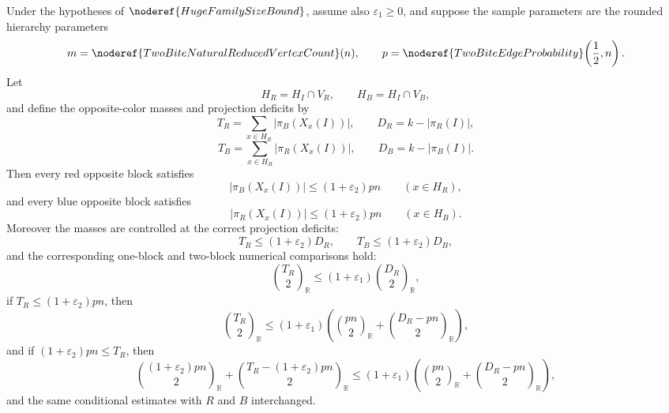 \begin{lemma}
Under the hypotheses of \(\noderef{HugeFamilySizeBound}\), assume also
\(\varepsilon_1\ge0\), and suppose the sample parameters are the rounded
hierarchy parameters
\[
m=\noderef{TwoBiteNaturalReducedVertexCount}(n),
\qquad
p=\noderef{TwoBiteEdgeProbability}\!\left(\frac12,n\right).
\]
Let
\[
H_R=H_I\cap V_R,\qquad H_B=H_I\cap V_B,
\]
and define the opposite-color masses and projection deficits by
\[
T_R=\sum_{x\in H_R}|\pi_B(X_x(I))|,\qquad
D_R=k-|\pi_R(I)|,
\]
\[
T_B=\sum_{x\in H_B}|\pi_R(X_x(I))|,\qquad
D_B=k-|\pi_B(I)|.
\]
Then every red opposite block satisfies
\[
|\pi_B(X_x(I))|\le(1+\varepsilon_2)pn\qquad (x\in H_R),
\]
and every blue opposite block satisfies
\[
|\pi_R(X_x(I))|\le(1+\varepsilon_2)pn\qquad (x\in H_B).
\]
Moreover the masses are controlled at the correct projection deficits:
\[
T_R\le(1+\varepsilon_2)D_R,\qquad
T_B\le(1+\varepsilon_2)D_B,
\]
and the corresponding one-block and two-block numerical comparisons hold:
\[
\binom{T_R}{2}_{\mathbb R}
\le
(1+\varepsilon_1)\binom{D_R}{2}_{\mathbb R},
\]
if \(T_R\le(1+\varepsilon_2)pn\), then
\[
\binom{T_R}{2}_{\mathbb R}
\le
(1+\varepsilon_1)\left(
\binom{pn}{2}_{\mathbb R}
+\binom{D_R-pn}{2}_{\mathbb R}\right),
\]
and if \((1+\varepsilon_2)pn\le T_R\), then
\[
\binom{(1+\varepsilon_2)pn}{2}_{\mathbb R}
+\binom{T_R-(1+\varepsilon_2)pn}{2}_{\mathbb R}
\le
(1+\varepsilon_1)\left(
\binom{pn}{2}_{\mathbb R}
+\binom{D_R-pn}{2}_{\mathbb R}\right),
\]
and the same conditional estimates with \(R\) and \(B\) interchanged.
\end{lemma}
